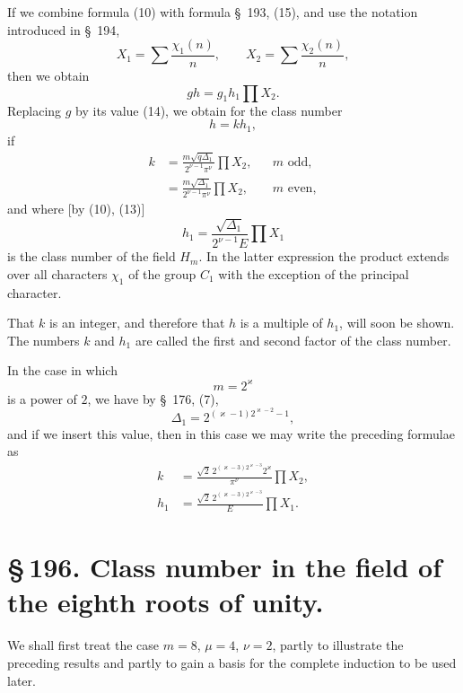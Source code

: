 \documentclass[11pt]{article}
\begin{document}
If we combine formula (10) with formula \S~193, (15), and use the notation introduced in \S~194,
\[
X_1=\sum\frac{\chi_1(n)}{n},\qquad X_2=\sum\frac{\chi_2(n)}{n},
\]
then we obtain
\[
gh=g_1h_1\prod X_2.
\]
Replacing $g$ by its value (14), we obtain for the class number
\begin{equation}
h=kh_1,
\tag{15}
\end{equation}
if
\begin{equation}
\begin{aligned}
k&=\frac{m\sqrt{q\Delta_1}}{2^{\nu-1}\pi^\nu}\prod X_2, &&m\text{ odd},\\
&=\frac{m\sqrt{\Delta_1}}{2^{\nu-1}\pi^\nu}\prod X_2, &&m\text{ even},
\end{aligned}
\tag{16}
\end{equation}
and where [by (10), (13)]
\begin{equation}
h_1=\frac{\sqrt{\Delta_1}}{2^{\nu-1}E}\prod X_1
\tag{17}
\end{equation}
is the class number of the field $H_m$. In the latter expression the product extends over all characters $\chi_1$ of the group $C_1$ with the exception of the principal character.

That $k$ is an integer, and therefore that $h$ is a multiple of $h_1$, will soon be shown. The numbers $k$ and $h_1$ are called the first and second factor of the class number.

In the case in which
\[
m=2^\varkappa
\]
is a power of $2$, we have by \S~176, (7),
\[
\Delta_1=2^{(\varkappa-1)2^{\varkappa-2}-1},
\]
and if we insert this value, then in this case we may write the preceding formulae as
\begin{equation}
\begin{aligned}
k&=\frac{\sqrt2\,2^{(\varkappa-3)2^{\varkappa-3}}2^\varkappa}{\pi^\nu}\prod X_2,\\
h_1&=\frac{\sqrt2\,2^{(\varkappa-3)2^{\varkappa-3}}}{E}\prod X_1.
\end{aligned}
\tag{18}
\end{equation}

\section*{\S\,196. Class number in the field of the eighth roots of unity.}

We shall first treat the case $m=8$, $\mu=4$, $\nu=2$, partly to illustrate the preceding results and partly to gain a basis for the complete induction to be used later.
\end{document}
